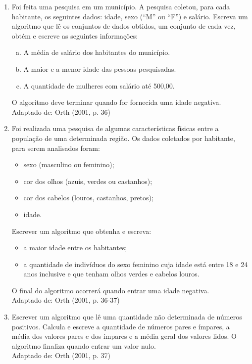 \documentclass[onecolumn,a4paper,10pt]{report}
\newcommand{\+}{\, + \,}
\newcommand{\<}{\hspace*{-0.4cm}}
\begin{document}
\begin{enumerate}[1.]
\item Foi feita uma pesquisa em um município. A pesquisa coletou, para cada habitante, os seguintes dados: idade, sexo (``M'' ou ``F'') e salário. Escreva um algoritmo que lê os conjuntos de dados obtidos, um conjunto de cada vez, obtém e escreve as seguintes informações:
\begin{enumerate}[a)]
    \item A média de salário dos habitantes do município.
    \item A maior e a menor idade das pessoas pesquisadas.
    \item A quantidade de mulheres com salário até 500,00.
\end{enumerate}
O algoritmo deve terminar quando for fornecida uma idade negativa.\\
{\tiny Adaptado de: Orth (2001, p. 36)}

\newpage
\item Foi realizada uma pesquisa de algumas características físicas entre a população de uma determinada região. Os dados coletados por habitante, para serem analisados foram:
\begin{itemize}
    \item sexo (masculino ou feminino);
    \item cor dos olhos (azuis, verdes ou castanhos);
    \item cor dos cabelos (louros, castanhos, pretos);
    \item idade.
\end{itemize}
Escrever um algoritmo que obtenha e escreva:
\begin{itemize}
    \item a maior idade entre os habitantes;
    \item a quantidade de indivíduos do sexo feminino cuja idade está entre 18 e 24 anos inclusive e que tenham olhos verdes e cabelos louros.
\end{itemize}
O final do algoritmo ocorrerá quando entrar uma idade negativa.\\
{\tiny Adaptado de: Orth (2001, p. 36-37)}

\item Escrever um algoritmo que lê uma quantidade não determinada de números positivos. Calcula e escreve a quantidade de números pares e ímpares, a média dos valores pares e dos ímpares e a média geral dos valores lidos. O algoritmo finaliza quando entrar um valor nulo.\\
{\tiny Adaptado de: Orth (2001, p. 37)}


\end{enumerate}
\end{document}

